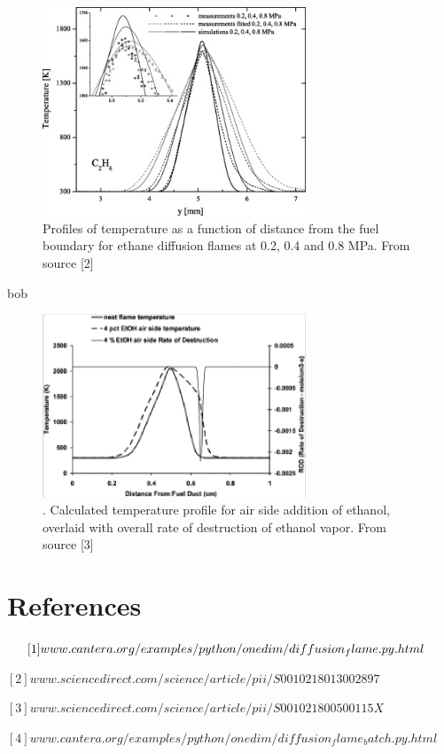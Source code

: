 \documentclass[a4paper]{article}
\newcommand{\sepspace}{\vspace*{1em}}
\begin{document}
\begin{figure} [h]
\centering
\includegraphics[width=0.7\textwidth]{01.png}
\caption{\label{fig:3}Profiles of temperature as a function of distance from the fuel boundary for ethane diffusion flames at 0.2, 0.4 and 0.8 MPa. From source [2]}
\end{figure}

bob

\begin{figure} [h]
\centering
\includegraphics[width=0.7\textwidth]{02.png}
\caption{\label{fig:4}. Calculated temperature profile for air side addition of ethanol, overlaid with overall rate of destruction of ethanol vapor. From source [3]}
\end{figure}



\sepspace

\sepspace

\sepspace

\section{References}

$
\hspace{5,35mm}[1] 
www.cantera.org/examples/python/onedim/diffusion_flame.py.html
$

$
[2] www.sciencedirect.com/science/article/pii/S0010218013002897
$

$
[3] www.sciencedirect.com/science/article/pii/S001021800500115X
$

$
[4]
www.cantera.org/examples/python/onedim/diffusion_flame_batch.py.html
$
\end{document}
